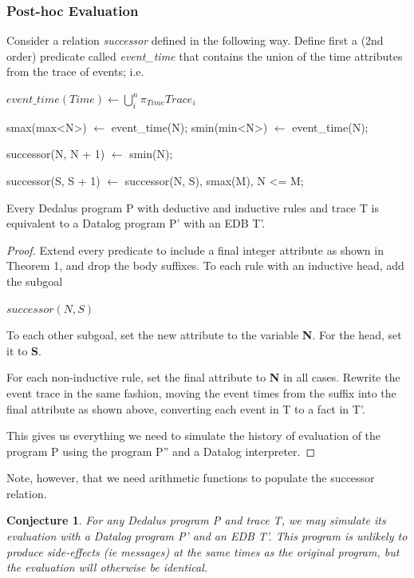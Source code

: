 \subsubsection{Post-hoc Evaluation}

Consider a relation \emph{successor} defined in the following way.
Define first a (2nd order) predicate called \emph{event\_time} 
that contains the union of the time attributes from the trace of events; i.e.

$event\_time(Time) \leftarrow \displaystyle\bigcup_{i}^n \pi_{Time}Trace_{i}$

\begin{Dedalus}
smax(max<N>) \(\leftarrow\) event\_time(N);
smin(min<N>) \(\leftarrow\) event\_time(N);

successor(N, N + 1) \(\leftarrow\) smin(N);

successor(S, S + 1) \(\leftarrow\) 
    successor(N, S),
    smax(M),
    N <= M;
\end{Dedalus}


\begin{theorem}
Every Dedalus program P with deductive and inductive rules and trace T is equivalent to a Datalog program P' with an EDB T'.
\end{theorem}

\begin{proof}

Extend every predicate to include a final integer attribute as shown in Theorem 1, and drop the body suffixes.  To each rule 
with an inductive head, add the subgoal 

$successor(N, S)$

To each other subgoal, set the new attribute to the variable \textbf{N}.  For the head, set it to \textbf{S}.  

For each non-inductive rule, set the final attribute to \textbf{N} in all cases.  Rewrite the event trace in the same fashion, 
moving the event times from the suffix into the final attribute as shown above, converting each event in T to a fact in T'.


This gives us everything we need to simulate the history of evaluation of the program P using the program P'' and a Datalog interpreter.

\end{proof}

Note, however, that we need arithmetic functions to populate the successor relation.

\newtheorem{conjecture}{Conjecture}
\begin{conjecture}
For any Dedalus program P and trace T, we may simulate its evaluation with a Datalog program P' and an EDB T'.  This program
is unlikely to produce side-effects (ie messages) at the same times as the original program, but the evaluation will otherwise be identical.
\end{conjecture}


